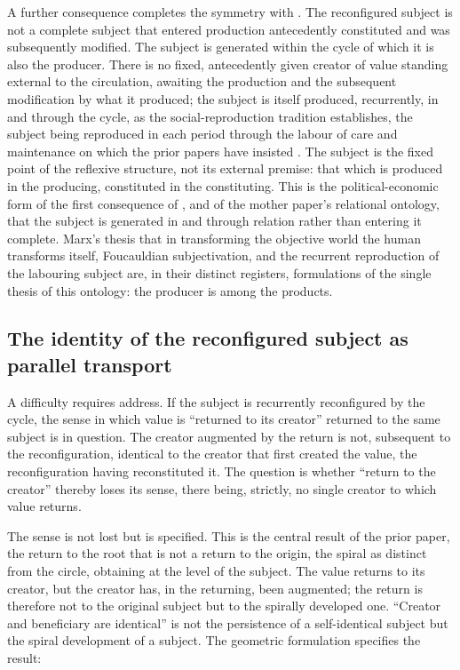 A further consequence completes the symmetry with . The reconfigured subject is not a complete subject that entered production antecedently constituted and was subsequently modified. The subject is generated within the cycle of which it is also the producer. There is no fixed, antecedently given creator of value standing external to the circulation, awaiting the production and the subsequent modification by what it produced; the subject is itself produced, recurrently, in and through the cycle, as the social-reproduction tradition establishes, the subject being reproduced in each period through the labour of care and maintenance on which the prior papers have insisted \parencite{federici2004,fraser2017,bhattacharya2017}. The subject is the fixed point of the reflexive structure, not its external premise: that which is produced in the producing, constituted in the constituting. This is the political-economic form of the first consequence of , and of the mother paper's relational ontology, that the subject is generated in and through relation rather than entering it complete. Marx's thesis that in transforming the objective world the human transforms itself, Foucauldian subjectivation, and the recurrent reproduction of the labouring subject are, in their distinct registers, formulations of the single thesis of this ontology: the producer is among the products.

\subsection{The identity of the reconfigured subject as parallel transport}
\label{p10:sec:identity}

A difficulty requires address. If the subject is recurrently reconfigured by the cycle, the sense in which value is ``returned to its creator'' returned to the same subject is in question. The creator augmented by the return is not, subsequent to the reconfiguration, identical to the creator that first created the value, the reconfiguration having reconstituted it. The question is whether ``return to the creator'' thereby loses its sense, there being, strictly, no single creator to which value returns.

The sense is not lost but is specified. This is the central result of the prior paper, the return to the root that is not a return to the origin, the spiral as distinct from the circle, obtaining at the level of the subject. The value returns to its creator, but the creator has, in the returning, been augmented; the return is therefore not to the original subject but to the spirally developed one. ``Creator and beneficiary are identical'' is not the persistence of a self-identical subject but the spiral development of a subject. The geometric formulation specifies the result:

